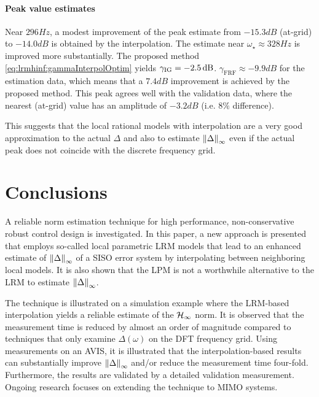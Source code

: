 \paragraph*{Peak value estimates}
\label{sec:lrmhinf:avis-peak-value}
Near $296\unit{Hz}$, a modest improvement of the peak estimate from $-15.3 \unit{dB}$ (at-grid) to $-14.0 \unit{dB}$ is obtained by the interpolation.
The estimate near $\omega_{\star} \approx 328\unit{Hz}$ is improved more substantially.
The proposed method \eqref{eq:lrmhinf:gammaInterpolOptim} yields $\gamma_{\mathrm{IG}}=-2.5\,\mathrm{dB}$.
$\gamma_{\mathrm{FRF}}\approx -9.9\unit{dB}$ for the estimation data, which means that a $7.4\unit{dB}$ improvement is achieved by the proposed method.
This peak agrees well with the validation data, where the nearest (at-grid) value has an amplitude of $-3.2\unit{dB}$ (i.e. $8\%$ difference).

This suggests that the local rational models with interpolation are a very good approximation to the actual $\Delta$ and also to estimate $\left\| \Delta \right\|_{\infty}$ even if the actual peak does not coincide with the discrete frequency grid.

\section{Conclusions}
\label{sec:lrmhinf:conclusion}
A reliable \Hinf{} norm estimation technique for high performance, non-conservative robust control design is investigated.
In this paper, a new approach is presented that employs so-called local parametric \gls{LRM} models that lead to an enhanced estimate of $\left\| \Delta \right\|_{\infty}$ of a \gls{SISO} error system by interpolating between neighboring local models.
It is also shown that the \gls{LPM} is not a worthwhile alternative to the \gls{LRM} to estimate $\left\| \Delta \right\|_{\infty}$.

The technique is illustrated on a simulation example where the \gls{LRM}-based interpolation yields a reliable estimate of the $\mathcal{H}_{\infty}{}$ norm.
It is observed that the measurement time is reduced by almost an order of magnitude compared to techniques that only examine $\Delta(\omega)$ on the \gls{DFT} frequency grid.
Using measurements on an \gls{AVIS}, it is illustrated that the interpolation-based results can substantially improve $\left\| \Delta \right\|_{\infty}$ and/or reduce the measurement time four-fold.
Furthermore, the results are validated by a detailed validation measurement.
Ongoing research focuses on extending the technique to \gls{MIMO} systems.



\begin{subappendices}
  
\end{subappendices}
